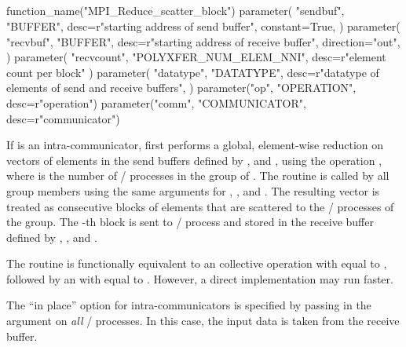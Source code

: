 \subsection{\texorpdfstring{}{MPI\_REDUCE\_SCATTER\_BLOCK}}
\label{subsec:coll-reduce-scatter-block} %

%
\begin{mpi-binding}
    function_name("MPI_Reduce_scatter_block")
    parameter(
        "sendbuf",
        "BUFFER",
        desc=r"starting address of send buffer",
        constant=True,
    )
    parameter(
        "recvbuf",
        "BUFFER",
        desc=r"starting address of receive buffer",
        direction="out",
    )
    parameter(
        "recvcount", "POLYXFER_NUM_ELEM_NNI", desc=r"element count per block"
    )
    parameter(
        "datatype",
        "DATATYPE",
        desc=r"datatype of elements of send and receive buffers",
    )
    parameter("op", "OPERATION", desc=r"operation")
    parameter("comm", "COMMUNICATOR", desc=r"communicator")
\end{mpi-binding}

If  is an intra-communicator, 
first performs a global, element-wise reduction on vectors of 
elements in the send buffers defined by ,  and ,
using the operation , where  is the number of \MPI/ processes in the group of .
The routine is called by all group members using the same arguments for ,
,  and .
The resulting vector is treated as  consecutive blocks of  elements
that are scattered to the \MPI/ processes of the group.
The -th block is sent to \MPI/ process  and stored in the receive buffer defined by
, , and .

\begin{implementors}
The  routine is functionally equivalent to
an  collective operation with  equal to ,
followed by an  with  equal to .
However, a direct implementation may run faster.
\end{implementors}

The ``in place'' option for intra-communicators is specified by passing 
in the  argument on \emph{all} \MPI/ processes.
In this case, the input data is taken from the receive buffer.

